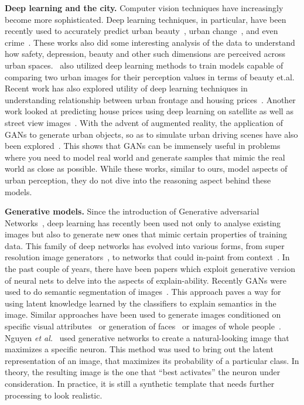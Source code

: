 \vspace{4pt}\noindent
\textbf{Deep learning and the city.} Computer vision techniques have increasingly become more sophisticated. Deep learning techniques, in particular, have been recently used to accurately predict urban beauty~\cite{dubey2016deep,seresinhe2017using}, urban change~\cite{naik2017computer}, and even crime~\cite{DeNadai16,arietta2014city}. These works also did some interesting analysis of the data to understand how safety, depression, beauty and other such dimensions are perceived across urban spaces.~\cite{dubey2016deep} also utilized deep learning methods to train models capable of comparing two urban images for their perception values in terms of beauty et.al. Recent work has also explored utility of deep learning techniques in understanding relationship between urban frontage and housing prices~\cite{frontage}. Another work looked at predicting house prices using deep learning on satellite as well as street view images~\cite{law2018take}. With the advent of augmented reality, the application of GANs to generate urban objects, so as to simulate urban driving scenes have also been explored~\cite{alhaija2018augmented}. This shows that GANs can be immensely useful in problems where you need to model real world and generate samples that mimic the real world as close as possible. While these works, similar to ours, model aspects of urban perception, they do not dive into the reasoning aspect behind these models.

\vspace{4pt}\noindent
\textbf{Generative models.} Since the introduction of Generative adversarial Networks~\cite{goodfellow2014generative}, deep learning has recently been used not only to analyse existing images but also to generate new ones that mimic certain properties of training data. This family of deep networks has evolved into various forms, from super resolution image generators~\cite{ledig2017photo}, to networks that could in-paint from context~\cite{pathak2016context}. In the past couple of years, there have been papers which exploit generative version of neural nets to delve into the aspects of explain-ability. Recently GANs were used to do semantic segmentation of images~\cite{luc2016semantic}. This approach paves a way for using latent knowledge learned by the classifiers to explain semantics in the image. Similar approaches have been used to generate images conditioned on specific visual attributes~\cite{yan2015attribute2image} or generation of faces~\cite{taigman2016unsupervised} or images of whole people~\cite{ma2018disentangled}.
Nguyen \emph{et al.}~\cite{nguyen2016synthesizing} used generative networks to create a natural-looking image that maximizes a specific neuron. This method was used to bring out the latent representation of an image, that maximizes its probability of a particular class. In theory, the resulting image is the one that ``best activates'' the neuron under consideration. In practice, it is still a synthetic template that needs further processing to look realistic. 

